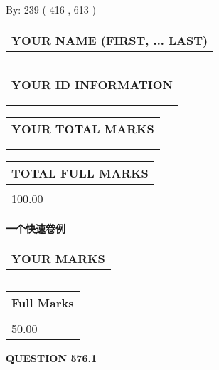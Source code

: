 \documentclass{ctexart}
\begin{document}
   
\hspace{1.0in} By: 
 239 ( 416 ,  613 )
   
   
   
   
\newpage 
\setcounter{page}{ 
   576001 } 
   
   
   
   
\noindent\begin{tabular}{|l|}
\hline
YOUR NAME (FIRST, ... LAST)  \\
\hline
 \\ 
 \\ 
\hline
\end{tabular}
\hspace{0.05in} \begin{tabular}{|l|}
\hline
 YOUR   ID   INFORMATION  \\
\hline
 \\ 
 \\ 
\hline
\end{tabular}
   
   
\vspace{0.2in}\noindent\begin{tabular}{|l|}
\hline
YOUR TOTAL MARKS  \\
\hline
 \\ 
 \\ 
\hline
\end{tabular}
\hspace{0.05in} \begin{tabular}{|l|}
\hline
TOTAL FULL MARKS  \\
\hline
 \\ 
100.00 \\
\hline
\end{tabular}
   
   
 \vspace{0.2in}
{\LARGE {\textbf{ 一个快速卷例}}}
   
   
  
\vspace{0.2in}
  
\noindent\begin{tabular}{|l|}
\hline
 YOUR MARKS  \\
\hline
 \\ 
 \\ 
\hline
\end{tabular}
\hspace{0.05in} \begin{tabular}{|l|}
\hline
 Full Marks  \\
\hline
 \\ 
50.00 \\
\hline
\end{tabular}
{\textbf{\Large{QUESTION
576.1 
}}}
  
\end{document}
